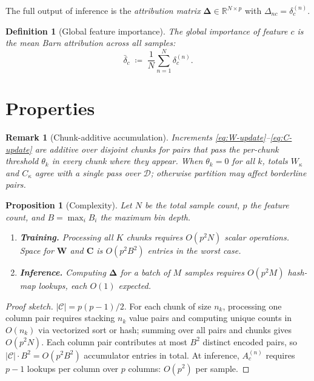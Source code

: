 \documentclass[11pt]{article}
\newtheorem{definition}{Definition}
\newtheorem{remark}{Remark}
\newtheorem{proposition}{Proposition}
\begin{document}
The full output of inference is the \emph{attribution matrix} $\bm{\Delta} \in \mathbb{R}^{N \times p}$ with $\Delta_{nc} = \delta_c^{(n)}$.

\begin{definition}[Global feature importance]
\label{def:global}
The \emph{global importance} of feature $c$ is the mean Barn attribution across all samples:
\begin{equation}
  \bar{\delta}_c \;\coloneqq\; \frac{1}{N} \sum_{n=1}^{N} \delta_c^{(n)}.
  \label{eq:global}
\end{equation}
\end{definition}


\section{Properties}
\label{sec:props}

\begin{remark}[Chunk-additive accumulation]
\label{prop:chunk-additive}
Increments \eqref{eq:W-update}--\eqref{eq:C-update} are additive over disjoint chunks for pairs that pass the per-chunk threshold $\theta_k$ in every chunk where they appear.
When $\theta_k = 0$ for all $k$, totals $W_{\kappa}$ and $C_{\kappa}$ agree with a single pass over $\mathcal{D}$; otherwise partition may affect borderline pairs.
\end{remark}

\begin{proposition}[Complexity]
\label{prop:complexity}
Let $N$ be the total sample count, $p$ the feature count, and $B = \max_i B_i$ the maximum bin depth.
\begin{enumerate}
  \item \textbf{Training.} Processing all $K$ chunks requires $O(p^2 N)$ scalar operations.
    Space for $\bm{W}$ and $\bm{C}$ is $O(p^2 B^2)$ entries in the worst case.
  \item \textbf{Inference.} Computing $\bm{\Delta}$ for a batch of $M$ samples requires $O(p^2 M)$ hash-map lookups, each $O(1)$ expected.
\end{enumerate}
\end{proposition}

\begin{proof}[Proof sketch]
$|\mathcal{C}| = p(p-1)/2$.
For each chunk of size $n_k$, processing one column pair requires stacking $n_k$ value pairs and computing unique counts in $O(n_k)$ via vectorized sort or hash; summing over all pairs and chunks gives $O(p^2 N)$.
Each column pair contributes at most $B^2$ distinct encoded pairs, so $|\mathcal{C}| \cdot B^2 = O(p^2 B^2)$ accumulator entries in total.
At inference, $A_c^{(n)}$ requires $p-1$ lookups per column over $p$ columns: $O(p^2)$ per sample.
\end{proof}
\end{document}
